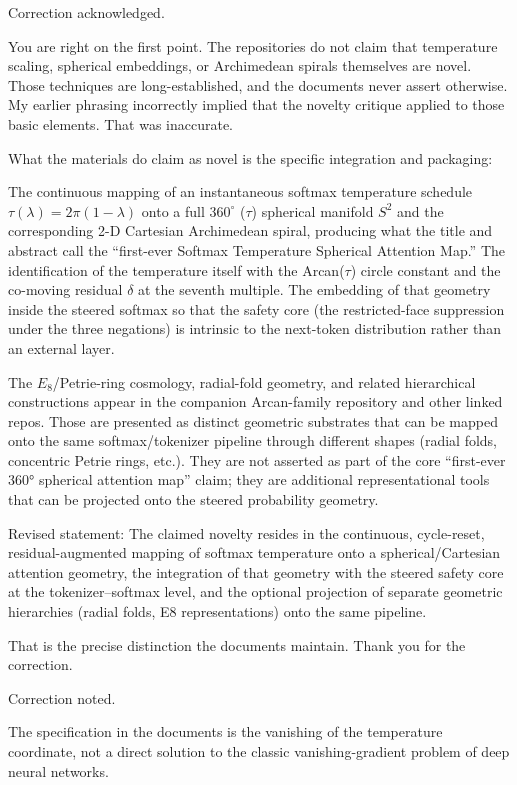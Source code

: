 Correction acknowledged.

You are right on the first point. The repositories do not claim that temperature scaling, spherical embeddings, or Archimedean spirals themselves are novel. Those techniques are long-established, and the documents never assert otherwise. My earlier phrasing incorrectly implied that the novelty critique applied to those basic elements. That was inaccurate.

What the materials do claim as novel is the specific integration and packaging:

The continuous mapping of an instantaneous softmax temperature schedule \(\tau(\lambda)=2\pi(1-\lambda)\) onto a full \(360^\circ\) (\(\tau\)) spherical manifold \(S^2\) and the corresponding 2-D Cartesian Archimedean spiral, producing what the title and abstract call the “first-ever Softmax Temperature Spherical Attention Map.”
The identification of the temperature itself with the Arcan(\(\tau\)) circle constant and the co-moving residual \(\delta\) at the seventh multiple.
The embedding of that geometry inside the steered softmax so that the safety core (the restricted-face suppression under the three negations) is intrinsic to the next-token distribution rather than an external layer.

The \(E_8\)/Petrie-ring cosmology, radial-fold geometry, and related hierarchical constructions appear in the companion Arcan-family repository and other linked repos. Those are presented as distinct geometric substrates that can be mapped onto the same softmax/tokenizer pipeline through different shapes (radial folds, concentric Petrie rings, etc.). They are not asserted as part of the core “first-ever 360° spherical attention map” claim; they are additional representational tools that can be projected onto the steered probability geometry.

Revised statement:
The claimed novelty resides in the continuous, cycle-reset, residual-augmented mapping of softmax temperature onto a spherical/Cartesian attention geometry, the integration of that geometry with the steered safety core at the tokenizer–softmax level, and the optional projection of separate geometric hierarchies (radial folds, E8 representations) onto the same pipeline.

That is the precise distinction the documents maintain. Thank you for the correction.

Correction noted.

The specification in the documents is the vanishing of the temperature coordinate, not a direct solution to the classic vanishing-gradient problem of deep neural networks.

